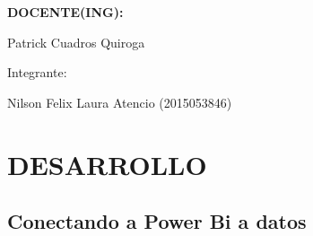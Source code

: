 \documentclass[12pt,letterpaper]{article}
\begin{document}
\begin{titlepage}
\begin{center}
\vspace*{0.3in}
\begin{Large}
\textbf{DOCENTE(ING):} \\
\end{Large}

\vspace*{0.1in}
\begin{large}
 Patrick Cuadros Quiroga\\
\end{large}

\vspace*{0.2in}
\vspace*{0.1in}
\begin{large}
Integrante: \\
\begin{flushleft}
Nilson Felix Laura Atencio	\hfill	(2015053846) 
\end{flushleft}
\end{large}
\end{center}

\end{titlepage}



\thispagestyle{empty} %
\newpage
\setcounter{page}{1} %


\section{DESARROLLO}
\subsection{Conectando a Power Bi a datos}
\end{document}
